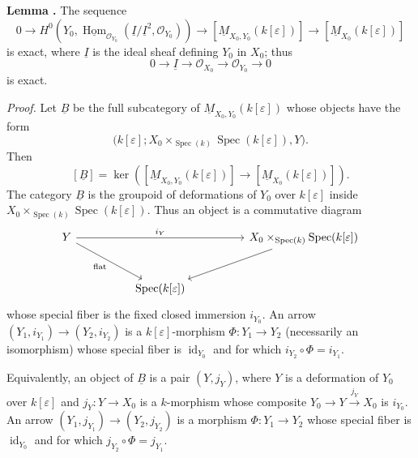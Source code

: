 
\medskip
\noindent\textbf{Lemma .}
The sequence
\[
0\longrightarrow
H^0\!\left(
Y_0,
\underline{\operatorname{Hom}}_{\mathcal O_{Y_0}}
(\underline I/\underline I^2,\mathcal O_{Y_0})
\right)
\longrightarrow[\underline M_{X_0,Y_0}(k[\varepsilon])]
\longrightarrow[\underline M_{X_0}(k[\varepsilon])]
\]
is exact, where $\underline I$ is the ideal sheaf defining $Y_0$ in
$X_0$; thus
\[
0\longrightarrow\underline I\longrightarrow\mathcal O_{X_0}
\longrightarrow\mathcal O_{Y_0}\longrightarrow0
\]
is exact.


\medskip
\noindent\textit{Proof.}
Let $\underline B$ be the full subcategory of
$\underline M_{X_0,Y_0}(k[\varepsilon])$ whose objects have the form
\[
\bigl(k[\varepsilon];
X_0\times_{\operatorname{Spec}(k)}\operatorname{Spec}(k[\varepsilon]),
Y\bigr).
\]
Then
\[
[\underline B]
=\ker\!\left(
[\underline M_{X_0,Y_0}(k[\varepsilon])]
\longrightarrow[\underline M_{X_0}(k[\varepsilon])]
\right).
\]
The category $\underline B$ is the groupoid of deformations of $Y_0$
over $k[\varepsilon]$ inside
$X_0\times_{\operatorname{Spec}(k)}\operatorname{Spec}(k[\varepsilon])$.
Thus an object is a commutative diagram
\[
\begin{tikzcd}[column sep=huge,row sep=large]
Y \arrow[rr,"i_Y"] \arrow[dr,"\mathrm{flat}"']
&& X_0\times_{\operatorname{Spec}(k)}
   \operatorname{Spec}(k[\varepsilon]) \arrow[dl] \\
& \operatorname{Spec}(k[\varepsilon]) &
\end{tikzcd}
\]
whose special fiber is the fixed closed immersion $i_{Y_0}$. An
arrow $(Y_1,i_{Y_1})\longrightarrow(Y_2,i_{Y_2})$ is a
$k[\varepsilon]$-morphism $\Phi:Y_1\longrightarrow Y_2$ (necessarily
an isomorphism) whose special fiber is $\operatorname{id}_{Y_0}$ and
for which $i_{Y_2}\circ\Phi=i_{Y_1}$.

Equivalently, an object of $\underline B$ is a pair $(Y,j_Y)$, where
$Y$ is a deformation of $Y_0$ over $k[\varepsilon]$ and
$j_Y:Y\longrightarrow X_0$ is a $k$-morphism whose composite
$Y_0\longrightarrow Y\xrightarrow{j_Y}X_0$ is $i_{Y_0}$. An arrow
$(Y_1,j_{Y_1})\longrightarrow(Y_2,j_{Y_2})$ is a morphism
$\Phi:Y_1\longrightarrow Y_2$ whose special fiber is
$\operatorname{id}_{Y_0}$ and for which
$j_{Y_2}\circ\Phi=j_{Y_1}$.

